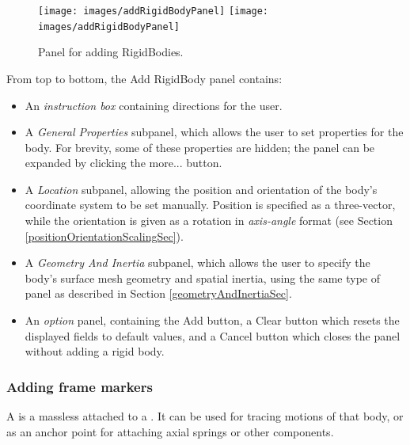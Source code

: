 \documentclass{article}
\begin{document}
\begin{figure}
\begin{center}
\iflatexml
\texttt{[image: images/addRigidBodyPanel]}
\else
\texttt{[image: images/addRigidBodyPanel]}
\fi
\end{center}
\caption{Panel for adding RigidBodies.}%
\label{addRigidBodyPanelFig}
\end{figure}

From top to bottom, the {\sf Add RigidBody} panel contains:

\begin{itemize}

\item An {\it instruction box} containing directions for the user.

\item A {\it General Properties} subpanel, which allows the user to set properties
for the body. For brevity, some of these properties are hidden;
the panel can be expanded by clicking the {\sf more...} button.

\item A {\it Location} subpanel, allowing the position and orientation of the
body's coordinate system to be set manually. Position is specified as
a three-vector, while the orientation is given as a rotation in
{\it axis-angle} format (see Section \ref{positionOrientationScalingSec}).

\item A {\it Geometry And Inertia} subpanel, which allows the user to specify the
body's surface mesh geometry and spatial inertia, using the
same type of panel as described in Section \ref{geometryAndInertiaSec}.

\item An {\it option} panel, containing the {\sf Add} button, a {\sf Clear} button
which resets the displayed fields to default values, and a {\sf Cancel}
button which closes the panel without adding a rigid body.

\end{itemize}

\subsubsection{Adding frame markers}
\label{addingFrameMarkersSec}

A  is a massless
 attached to a
. It can be used for tracing
motions of that body, or as an anchor point for attaching axial
springs or other components.
\end{document}
